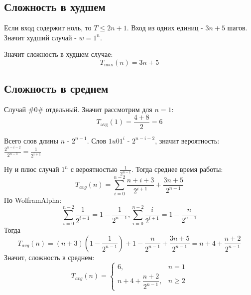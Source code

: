 \documentclass[12pt]{article}
\begin{document}
\subsection*{Сложность в худшем}

Если вход содержит ноль, то $T \le 2n+1$. Вход из одних единиц - $3n+5$ шагов. Значит худший случай - $w=1^n$.

Значит сложность в худшем случае:
\[
T_{\max}(n)=3n+5
\]

\subsection*{Сложность в среднем}

Случай $\#0\#$ отдельный. Значит рассмотрим для $n=1$:
\[
T_{\mathrm{avg}}(1)=\frac{4+8}{2}=6
\]

Всего слов длины $n$ - $2^{n-1}$. Слов $1u01^i$ - $2^{n-i-2}$, значит вероятность: $\frac{2^{n-i-2}}{2^{n-1}}=\frac{1}{2^{i+1}}$

Ну и плюс случай $1^n$ с вероятностью $\frac{1}{2^{n-1}}$. Тогда среднее время работы:
\[
T_{avg}(n)
=\sum_{i=0}^{n-2}\frac{n+i+3}{2^{i+1}}
 +\frac{3n+5}{2^{n-1}}
\]
По WolframAlpha:
\[
\sum_{i=0}^{n-2}\frac{1}{2^{i+1}}=1-\frac{1}{2^{n-1}},
\sum_{i=0}^{n-2}\frac{i}{2^{i+1}}=1-\frac{n}{2^{n-1}}
\]
Тогда
\[
T_{avg}(n)
=(n+3)\left(1-\frac{1}{2^{n-1}}\right)
  +1-\frac{n}{2^{n-1}}+\frac{3n+5}{2^{n-1}}=n+4+\frac{n+2}{2^{n-1}}
\]
Значит, сложность в среднем:
\[
T_{avg}(n)=
\begin{cases}
6, & n=1\\
 n+4+\dfrac{n+2}{2^{n-1}}, & n\geq2
\end{cases}
\]
\end{document}
